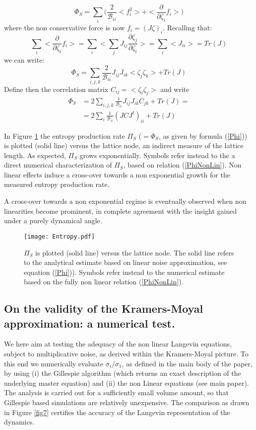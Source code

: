 \documentclass[showpacs,prl,superscriptaddress,nofootinbib, twocolumn]{revtex4}
\begin{document}
\[
\Phi_S= \sum_i \big( \frac{2}{{\mathcal B}_{ii}} <f_i^2 >+<\frac{\partial}{\partial \zeta_i}f_i>\big)
\]
where the non conservative force is now $f_i=(J\zeta)_i$.  
Recalling that:
\[
\sum_i <\frac{\partial}{\partial \zeta_i}f_i>=\sum_i <\sum_j J_{ij} \frac{\partial \zeta_j}{\partial \zeta_i}>=\sum_i <J_{ii}>=Tr(J)
\]
we can write: 
\[
\Phi_S=\sum_{i,j,k} \frac{2}{{\mathcal B}_{ii}} J_{ij}J_{ik}<\zeta_j\zeta_k>+Tr(J)
\]
Define then the correlation matrix $C_{ij}=<\zeta_i\zeta_j>$ and write
\begin{equation}
\begin{split}
\label{Phi}
\Phi_S &=2\sum_{i,j,k} \frac{1}{{\mathcal B}_{ii}} J_{ij}J_{ik}C_{jk}+Tr(J)=\\
&=2\sum_{i}\frac{1}{{\mathcal B}_{ii}}(JCJ^t)_{ii}+Tr(J)
\end{split}
\end{equation}


In Figure \ref{fig6} the entropy production rate $\Pi_S$ ($=\Phi_S$, as given by formula (\ref{Phi})) is plotted (solid line) versus the lattice node, an indirect measure of the lattice length. As expected, $\Pi_S$ grows exponentially. Symbols refer instead to the a direct numerical characterization of $\Pi_S$, based on relation (\ref{PhiNonLin}). Non linear effects induce a cross-over towards a non exponential growth for the measured entropy production rate. 



A cross-over towards a non exponential regime is eventually observed when non linearities become prominent, in complete agreement with the insight gained under a purely dynamical angle.



\begin{figure}
 \centering
   {\texttt{[image: Entropy.pdf]}}
   \caption{ $\Pi_S$ is plotted (solid line) versus the lattice node. The solid line refers to the analytical estimate based on  linear noise approximation, see equation (\ref{Phi})). Symbols refer instead to the numerical estimate based on the fully non linear relation (\ref{PhiNonLin}). 
}
   \label{fig6}
  \end{figure}

\subsection{On the validity of the Kramers-Moyal approximation: a numerical test.}

We here aim at testing the adequacy of the non linear Langevin equations, subject to multiplicative noise, as derived within the Kramers-Moyal picture. To this end we numerically evaluate  $\sigma_i/\sigma_1$, as defined in the main body of the paper, by using (i)
the Gillespie algorithm (which returns an exact description of the underlying master equation) and (ii) the non Linear equations (see main paper). The analysis is carried out for a sufficiently small volume amount, so that Gillespie based simulations are relatively unexpensive.  The comparison as drawn in Figure  \ref{fig7} certifies the accuracy of the Langevin representation of the dynamics. 
\end{document}
